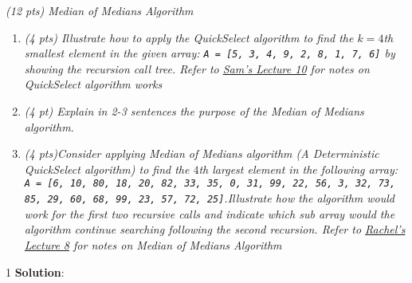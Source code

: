 \documentclass[9pt]{article}
\def\solutions{1}
\begin{document}
\vspace{5mm}

\item{\itshape (12 pts) Median of Medians Algorithm
	}
	\begin{enumerate}%
	
	\item{\itshape
    (4 pts) Illustrate how to apply the QuickSelect algorithm to find the $k = 4$th smallest element in the given array: \texttt{A = [5, 3, 4, 9, 2, 8, 1, 7, 6]} by showing the recursion call tree. Refer to  \href{https://canvas.colorado.edu/courses/69354/files/28668920?wrap=1}{Sam's Lecture 10} for notes on QuickSelect algorithm works }
    
    \item{\itshape
    (4 pt) Explain in 2-3 sentences the purpose of the Median of Medians algorithm.}
	
	\item{ \itshape
(4 pts)Consider applying Median of Medians algorithm (A Deterministic QuickSelect algorithm) to find the $4$th largest element in the following array: \texttt{A = [6, 10, 80, 18, 20, 82, 33, 35, 0, 31, 99, 22, 56, 3, 32, 73, 85, 29, 60, 68, 99, 23, 57, 72, 25]}.Illustrate how the algorithm would work for the first two recursive calls and indicate which sub array would the algorithm continue searching following the second recursion. Refer to \href{https://canvas.colorado.edu/courses/69354/files/28587193?wrap=1}{Rachel's Lecture 8} for notes on Median of Medians Algorithm}
		\end{enumerate}
\if\solutions1
\vspace{3mm}
{\bf Solution}: \\
\end{document}
